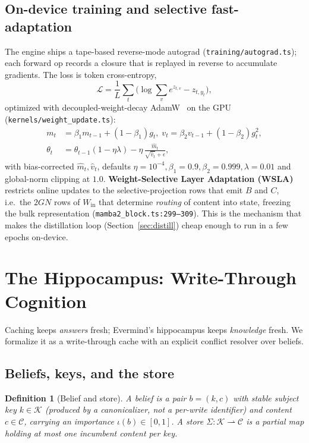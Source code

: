 \documentclass[journal,onecolumn,11pt]{IEEEtran}
\newtheorem{definition}{Definition}
\begin{document}
\subsection{On-device training and selective fast-adaptation}
The engine ships a tape-based reverse-mode autograd
(\texttt{training/autograd.ts}); each forward op records a closure that is
replayed in reverse to accumulate gradients. The loss is token cross-entropy,
\begin{equation}
\mathcal{L}=\frac1L\sum_{t}\Big(\log\textstyle\sum_v e^{z_{t,v}}-z_{t,y_t}\Big),
\label{eq:ce}
\end{equation}
optimized with decoupled-weight-decay AdamW~\cite{loshchilov2019adamw} on the GPU
(\texttt{kernels/weight\_update.ts}):
\begin{align}
m_t&=\beta_1 m_{t-1}+(1-\beta_1)g_t,\;
v_t=\beta_2 v_{t-1}+(1-\beta_2)g_t^2,\\
\theta_t&=\theta_{t-1}(1-\eta\lambda)-\eta\,\frac{\hat m_t}{\sqrt{\hat v_t}+\epsilon},
\end{align}
with bias-corrected $\hat m_t,\hat v_t$, defaults
$\eta{=}10^{-4},\beta_1{=}0.9,\beta_2{=}0.999,\lambda{=}0.01$ and global-norm
clipping at $1.0$. \textbf{Weight-Selective Layer Adaptation (WSLA)} restricts
online updates to the selective-projection rows that emit $B$ and $C$, i.e.\ the
$2GN$ rows of $W_{\text{in}}$ that determine \emph{routing} of content into
state, freezing the bulk representation (\texttt{mamba2\_block.ts:299--309}).
This is the mechanism that makes the distillation loop
(Section~\ref{sec:distill}) cheap enough to run in a few epochs on-device.

\section{The Hippocampus: Write-Through Cognition}
\label{sec:hippocampus}
Caching keeps \emph{answers} fresh; Evermind's hippocampus keeps \emph{knowledge}
fresh. We formalize it as a write-through cache with an explicit conflict
resolver over beliefs.

\subsection{Beliefs, keys, and the store}
\begin{definition}[Belief and store]
A \emph{belief} is a pair $b=(k,c)$ with stable subject key $k\in\mathcal{K}$
(produced by a canonicalizer, not a per-write identifier) and content
$c\in\mathcal{C}$, carrying an importance $\iota(b)\in[0,1]$. A \emph{store}
$\Sigma:\mathcal{K}\rightharpoonup\mathcal{C}$ is a partial map holding at most
one incumbent content per key.
\end{definition}
\end{document}
